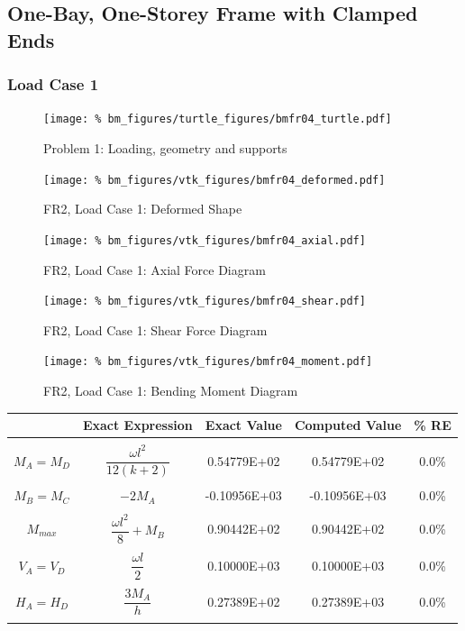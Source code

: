 %
%
\clearpage
\subsection{One-Bay, One-Storey Frame with Clamped Ends}
%
%
\subsubsection{Load Case 1}
\begin{figure}[h]
    \texttt{[image: \%
                            bm\_figures/turtle\_figures/bmfr04\_turtle.pdf]}
    \centering
    \caption{Problem 1: Loading, geometry and supports}
    \label{fig:bmfr04_turtle}
\end{figure}


\begin{figure}[!htb]
    \texttt{[image: \%
                     bm\_figures/vtk\_figures/bmfr04\_deformed.pdf]}
    \centering
    \caption{FR2, Load Case 1: Deformed Shape}
    \label{fig:bmfr04_deformed}
\end{figure}
\begin{figure}[!htb]
    \texttt{[image: \%
                     bm\_figures/vtk\_figures/bmfr04\_axial.pdf]}
    \centering
    \caption{FR2, Load Case 1: Axial Force Diagram}
    \label{fig:bmfr04_shear}
\end{figure}
\begin{figure}[!htb]
    \texttt{[image: \%
                     bm\_figures/vtk\_figures/bmfr04\_shear.pdf]}
    \centering
    \caption{FR2, Load Case 1: Shear Force Diagram}
    \label{fig:bmfr04_shear}
\end{figure}
\begin{figure}[!htb]
    \texttt{[image: \%
                     bm\_figures/vtk\_figures/bmfr04\_moment.pdf]}
    \centering
    \caption{FR2, Load Case 1: Bending Moment Diagram}
    \label{fig:bmfr04_moment}
\end{figure}
\begin{table}[h!]
\centering
\begin{tabular}{ c| c c c c }
    & Exact Expression & Exact Value & Computed Value & \% RE \\ \hline \\
    $M_A=M_D$   & $\dfrac{\omega l^2}{12(k+2)}$ &  0.54779E+02 & 0.54779E+02 & 0.0\% \\ \\
    $M_B=M_C$   & $-2M_A$ &  -0.10956E+03 & -0.10956E+03 & 0.0\% \\ \\
    $M_{max}$   & $\dfrac{\omega l^2}{8} + M_B$ &  0.90442E+02 & 0.90442E+02 & 0.0\% \\ \\
    $V_A=V_D$   & $\dfrac{\omega l}{2}$ &  0.10000E+03 & 0.10000E+03 & 0.0\% \\ \\
    $H_A=H_D$   & $\dfrac{3M_A}{h}$ &  0.27389E+02 & 0.27389E+03 & 0.0\% \\ \\
\end{tabular}
\end{table}

